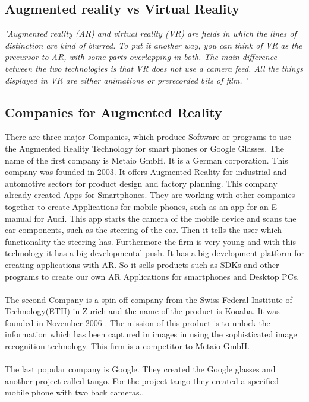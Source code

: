  \subsection{Augmented reality vs Virtual Reality}
 
 \textit{'Augmented reality (AR) and virtual reality (VR) are fields in which the lines of
 distinction are kind of blurred. To put it another way, you can think of VR as the
 precursor to AR, with some parts overlapping in both. The main difference
 between the two technologies is that VR does not use a camera feed. All the
 things displayed in VR are either animations or prerecorded bits of film.
 '\cite{AugmentedBook}}
 \subsection{Companies for Augmented Reality}
 There are three major Companies, which produce Software or programs to use the Augmented Reality Technology for smart phones or Google Glasses.  The name of the first company is Metaio GmbH. It is a German corporation. This company was founded in 2003. It offers Augmented Reality for industrial and automotive sectors for product design and factory planning. This company already created Apps for Smartphones. They are working with other companies together to create Applications for mobile phones, such as an app for an E-manual for  Audi. This app  starts the camera of the mobile device and scans the car components, such as the steering of the car. Then it tells the user which functionality the steering has. Furthermore the firm is very young and with this technology it has a big developmental push. It has a big development platform for creating applications with AR. So it sells products such as SDKs and other programs to create our own AR Applications for smartphones and Desktop PCs.
 \\
 \\
 The second Company is a spin-off company from the Swiss Federal Institute of Technology(ETH) in Zurich and the name of  the product is Kooaba. It was founded  in November 2006 . The mission of this product is to unlock the information which has been captured in images in using the sophisticated image recognition technology. This firm is a competitor to Metaio GmbH.
 \\
 \\ 
 The last popular company is Google. They created the Google glasses and another project called tango.  For the project tango they created a specified mobile phone with two back cameras..
 \\
 \\
 
